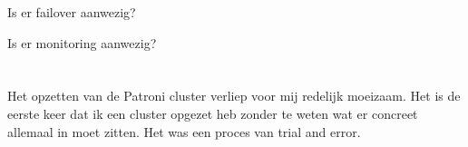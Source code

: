 Is er failover aanwezig?

Is er monitoring aanwezig?


\section{}
\label{sec:Persoonlijke conclusie}

Het opzetten van de Patroni cluster verliep voor mij redelijk moeizaam. Het is de eerste keer dat ik een cluster opgezet heb zonder te weten wat er concreet allemaal in moet zitten. Het was een proces van trial and error.


